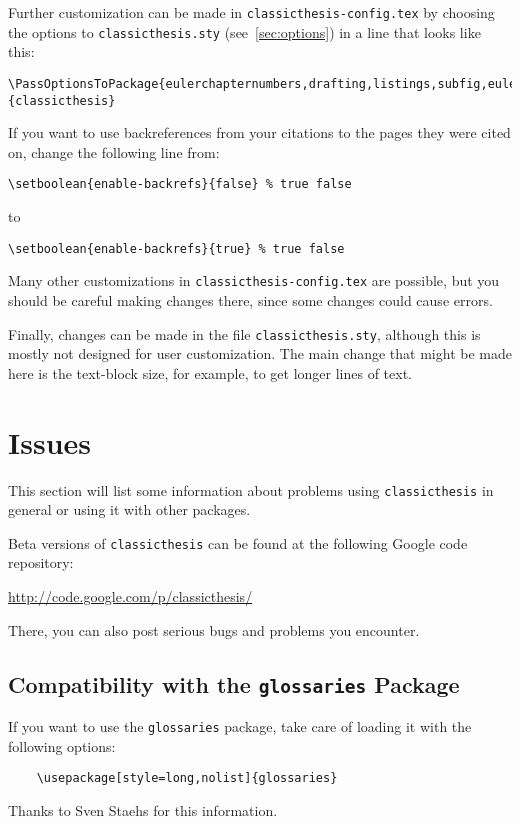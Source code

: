 Further customization can be made in \texttt{classicthesis-config.tex}
by choosing the options to \texttt{classicthesis.sty} 
(see~\autoref{sec:options}) in a line that looks like this:

\begin{lstlisting}[frame=lt]
\PassOptionsToPackage{eulerchapternumbers,drafting,listings,subfig,eulermath,parts}{classicthesis}
\end{lstlisting}

If you want to use backreferences from your citations to the pages
they were cited on, change the following line from:
\begin{lstlisting}[breaklines=false,frame=lt]
\setboolean{enable-backrefs}{false} % true false
\end{lstlisting}
to
\begin{lstlisting}[breaklines=false,frame=lt]
\setboolean{enable-backrefs}{true} % true false
\end{lstlisting}

Many other customizations in \texttt{classicthesis-config.tex} are
possible, but you should be careful making changes there, since some
changes could cause errors.

Finally, changes can be made in the file \texttt{classicthesis.sty},%
 although this is mostly not designed for user customization. The
main change that might be made here is the text-block size, for example,
to get longer lines of text.


\section{Issues}\label{sec:issues}
This section will list some information about problems using
\texttt{classic\-thesis} in general or using it with other packages.

Beta versions of \texttt{classicthesis} can be found at the following 
Google code repository:
\begin{center}
	\url{http://code.google.com/p/classicthesis/}
\end{center}
There, you can also post serious bugs and problems you encounter.

\subsection*{Compatibility with the \texttt{glossaries} Package}
If you want to use the \texttt{glossaries} package, take care of loading it 
with the following options:
\begin{verbatim}
	\usepackage[style=long,nolist]{glossaries}
\end{verbatim}
Thanks to Sven Staehs for this information. 


